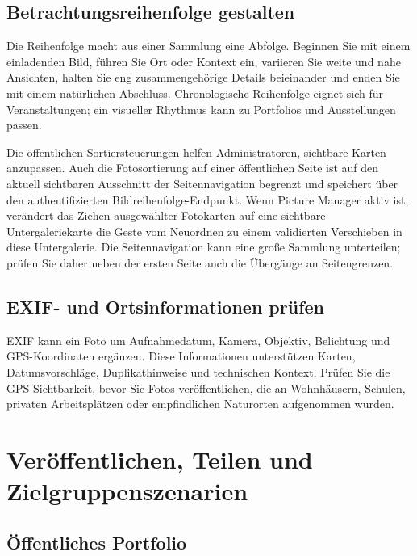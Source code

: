 \documentclass[11pt,a4paper]{article}
\begin{document}
\subsection{Betrachtungsreihenfolge gestalten}

Die Reihenfolge macht aus einer Sammlung eine Abfolge. Beginnen Sie mit einem
einladenden Bild, führen Sie Ort oder Kontext ein, variieren Sie weite und nahe
Ansichten, halten Sie eng zusammengehörige Details beieinander und enden Sie mit
einem natürlichen Abschluss. Chronologische Reihenfolge eignet sich für
Veranstaltungen; ein visueller Rhythmus kann zu Portfolios und Ausstellungen
passen.

Die öffentlichen Sortiersteuerungen helfen Administratoren, sichtbare Karten
anzupassen. Auch die Fotosortierung auf einer öffentlichen Seite ist auf den
aktuell sichtbaren Ausschnitt der Seitennavigation begrenzt und speichert über
den authentifizierten Bildreihenfolge-Endpunkt. Wenn Picture Manager aktiv ist,
verändert das Ziehen ausgewählter Fotokarten auf eine sichtbare
Untergaleriekarte die Geste vom Neuordnen zu einem validierten Verschieben in
diese Untergalerie. Die Seitennavigation kann eine große Sammlung unterteilen;
prüfen Sie daher neben der ersten Seite auch die Übergänge an Seitengrenzen.

\subsection{EXIF- und Ortsinformationen prüfen}

EXIF kann ein Foto um Aufnahmedatum, Kamera, Objektiv, Belichtung und
GPS-Koordinaten ergänzen. Diese Informationen unterstützen Karten,
Datumsvorschläge, Duplikathinweise und technischen Kontext. Prüfen Sie die
GPS-Sichtbarkeit, bevor Sie Fotos veröffentlichen, die an Wohnhäusern, Schulen,
privaten Arbeitsplätzen oder empfindlichen Naturorten aufgenommen wurden.

\section{Veröffentlichen, Teilen und Zielgruppenszenarien}
\label{sec:audiences}

\subsection{Öffentliches Portfolio}
\end{document}
